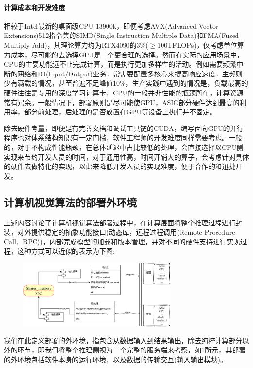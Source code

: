 \documentclass[master,anonymous]{shtthesis}
\begin{document}
\paragraph{计算成本和开发难度}
相较于Intel最新的桌面级CPU-13900k，即便考虑AVX(Advanced Vector Extensions)512指令集的SIMD(Single Instruction Multiple Data)和FMA(Fused Multiply Add)，其理论算力约为RTX4090的3$\%$($\geq$100TFLOPs)，仅考虑单位算力成本，尽可能的去选择GPU是一个更合理的选择。然而在实际的应用场景中，CPU的主要功能远不止完成计算，而是执行更加多样性的活动。例如需要频繁中断的网络和IO(Input/Output)业务，常需要配置多核心来提高响应速度，主频则少有满载的情况，甚至普遍不足峰值10$\%$，生产实践中遇到的情况是，负载最高的硬件往往是专用的深度学习计算卡，CPU的一般并非性能的瓶颈所在，计算资源常有冗余。一般情况下，部署原则是尽可能使GPU，ASIC部分硬件达到最高的利用率，部分前处理，后处理的是否放置在GPU等设备上执行并不固定。

除去硬件考量，即便是有完善文档和调试工具链的CUDA，编写面向GPU的并行程序也对体系结构知识有一定门槛，软件工程师的开发难度同样需要考虑。一般的，对于不构成性能瓶颈，在总体延迟中占比较低的处理，会直接选择以CPU侧实现来节约开发人员的时间，对于通用性高，时间开销大的算子，会考虑针对具体的硬件去做特化的实现，以此来降低开发人员的实现难度，便于合作的和迅捷开发。

\subsection{计算机视觉算法的部署外环境}\label{计算机视觉算法模型的部署外环境}
上述内容讨论了计算机视觉算法部署过程中，在计算层面将整个推理过程进行封装，对外提供稳定的抽象功能接口(动态库，远程过程调用(Remote Procedure Call，RPC))，内部完成模型的加载和版本管理，并对不同的硬件支持进行实现过程，这种方式可以近似的表示为下图:

\begin{figure}[htbp]
	\centering
	\includegraphics[width=8cm]{img/frame.pdf}
	\label{计算机视觉算法部署框架}
\end{figure}

我们在此定义部署的外环境，指包含从数据输入到结果输出，除去纯粹计算部分以外的环节，即我们将整个推理侧视为一个完整的服务端来考察，如\ref{计算机视觉算法部署框架}所示，其部署的外环境包括软件本身的运行环境，以及数据的传输交互(输入输出模块)。
\end{document}
